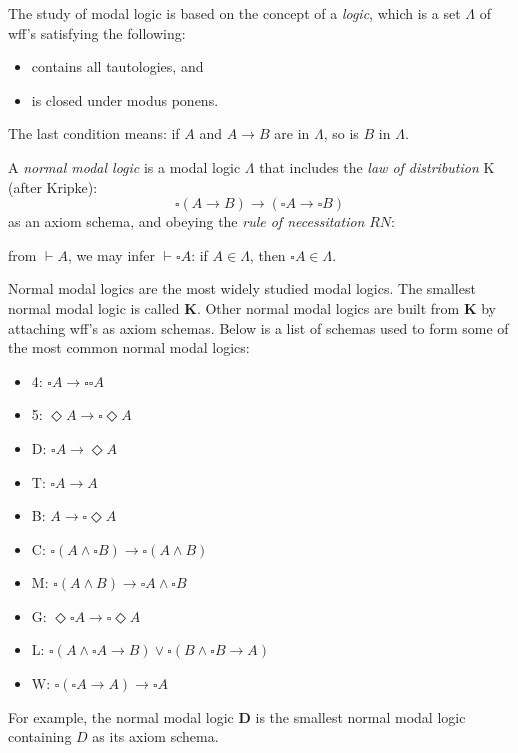 \documentclass[12pt]{article}
\begin{document}
The study of modal logic is based on the concept of a \emph{logic}, which is a set $\Lambda$ of wff's satisfying the following:
\begin{itemize}
\item contains all tautologies, and 
\item is closed under modus ponens.
\end{itemize}
The last condition means: if $A$ and $A\to B$ are in $\Lambda$, so is $B$ in $\Lambda$.

A \emph{normal modal logic} is a modal logic $\Lambda$ that includes the \emph{law of distribution} K (after Kripke):
$$\square (A\to B)\to (\square A \to \square B)$$
as an axiom schema, and obeying the \emph{rule of necessitation} $RN$:
\begin{center}
from $\vdash A$, we may infer $\vdash \square A$: if $A\in \Lambda$, then $\square A \in \Lambda$.
\end{center}

Normal modal logics are the most widely studied modal logics.  The smallest normal modal logic is called \textbf{K}.  Other normal modal logics are built from \textbf{K} by attaching wff's as axiom schemas.  Below is a list of schemas used to form some of the most common normal modal logics:
\begin{multicols}{2}{
\begin{itemize}
\item 4: $\square A\to \square \square A$
\item 5: $\Diamond A \to \square \Diamond A$
\item D: $\square A \to \Diamond A$
\item T: $\square A \to A$
\item B: $A\to \square \Diamond A$
\item C: $\square (A\wedge \square B)\to \square (A\wedge B)$
\item M: $\square (A\wedge B)\to \square A\wedge \square B$
\item G: $\Diamond \square A \to \square \Diamond A$
\item L: $\square (A\wedge \square A \to B) \vee \square (B\wedge \square B \to A)$
\item W: $\square (\square A \to A) \to \square A$
\end{itemize}
}\end{multicols}
For example, the normal modal logic \textbf{D} is the smallest normal modal logic containing $D$ as its axiom schema.
\end{document}
